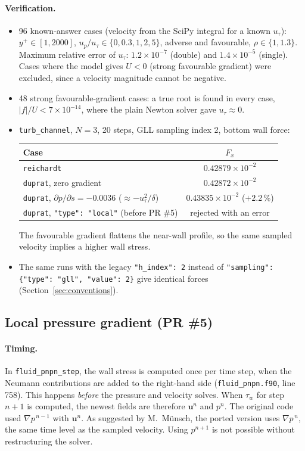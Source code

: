 \documentclass[11pt,a4paper]{article}
\newcommand{\code}[1]{\texttt{#1}}
\newcommand{\up}{u_p}
\newcommand{\utau}{u_\tau}
\newcommand{\dpds}{\partial p/\partial s}
\begin{document}
\paragraph{Verification.}
\begin{itemize}
  \item 96 known-answer cases (velocity from the SciPy integral for a known
    $\utau$): $y^+\in[1, 2000]$, $\up/\utau\in\{0, 0.3, 1, 2, 5\}$,
    adverse and favourable, $\rho\in\{1, 1.3\}$. Maximum relative error of
    $\utau$: $1.2\times10^{-7}$ (double) and $1.4\times10^{-5}$ (single).
    Cases where the model gives $U<0$ (strong favourable gradient) were
    excluded, since a velocity magnitude cannot be negative.
  \item 48 strong favourable-gradient cases: a true root is found in every
    case, $|f|/U < 7\times10^{-14}$, where the plain Newton solver gave
    $\utau\approx0$.
  \item \code{turb\_channel}, $N=3$, 20 steps, GLL sampling index 2, bottom
    wall force:
    \begin{center}
    \small
    \begin{tabular}{lc}
      \toprule
      Case & $F_x$ \\
      \midrule
      \code{reichardt} & $0.42879\times10^{-2}$ \\
      \code{duprat}, zero gradient & $0.42872\times10^{-2}$ \\
      \code{duprat}, $\dpds = -0.0036$ ($\approx -\utau^2/\delta$) & $0.43835\times10^{-2}$ ($+2.2$\,\%) \\
      \code{duprat}, \code{"type": "local"} (before PR \#5) & rejected with an error \\
      \bottomrule
    \end{tabular}
    \end{center}
    The favourable gradient flattens the near-wall profile, so the same
    sampled velocity implies a higher wall stress.
  \item The same runs with the legacy \code{"h\_index": 2} instead of
    \code{"sampling": \{"type": "gll", "value": 2\}} give identical forces
    (Section~\ref{sec:conventions}).
\end{itemize}

\subsection{Local pressure gradient (PR \#5)}
\label{sec:local}

\paragraph{Timing.} In \code{fluid\_pnpn\_step}, the wall stress is computed
once per time step, when the Neumann contributions are added to the
right-hand side (\code{fluid\_pnpn.f90}, line 758). This happens
\emph{before} the pressure and velocity solves. When $\tau_w$ for step
$n+1$ is computed, the newest fields are therefore $\mathbf{u}^n$ and
$p^n$. The original code used $\nabla p^{\,n-1}$ with $\mathbf{u}^n$. As
suggested by M.~Münsch, the ported version uses $\nabla p^{\,n}$, the same
time level as the sampled velocity. Using $p^{n+1}$ is not possible without
restructuring the solver.
\end{document}
